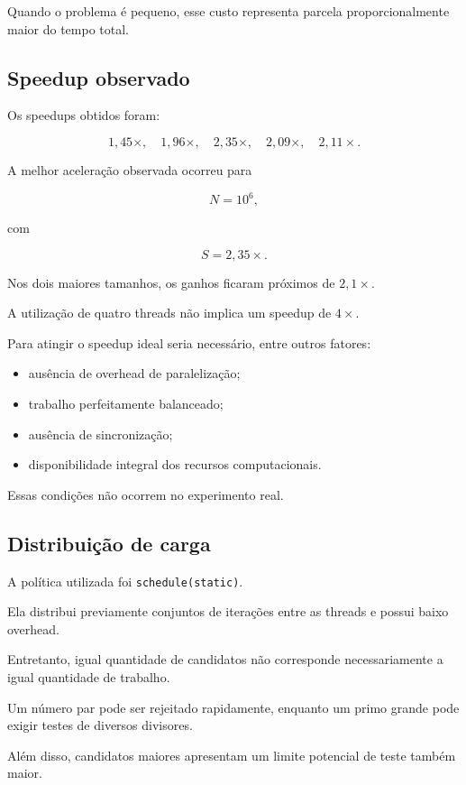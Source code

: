 Quando o problema é pequeno, esse custo representa parcela proporcionalmente
maior do tempo total.


\subsection{Speedup observado}

Os speedups obtidos foram:

\[
1,45\times,\quad
1,96\times,\quad
2,35\times,\quad
2,09\times,\quad
2,11\times.
\]

A melhor aceleração observada ocorreu para

\[
N=10^6,
\]

com

\[
S=2,35\times.
\]

Nos dois maiores tamanhos, os ganhos ficaram próximos de
\(2,1\times\).

A utilização de quatro threads não implica um speedup de \(4\times\).

Para atingir o speedup ideal seria necessário, entre outros fatores:

\begin{itemize}
    \item ausência de overhead de paralelização;
    \item trabalho perfeitamente balanceado;
    \item ausência de sincronização;
    \item disponibilidade integral dos recursos computacionais.
\end{itemize}

Essas condições não ocorrem no experimento real.


\subsection{Distribuição de carga}

A política utilizada foi \texttt{schedule(static)}.

Ela distribui previamente conjuntos de iterações entre as threads e possui
baixo overhead.

Entretanto, igual quantidade de candidatos não corresponde necessariamente
a igual quantidade de trabalho.

Um número par pode ser rejeitado rapidamente, enquanto um primo grande pode
exigir testes de diversos divisores.

Além disso, candidatos maiores apresentam um limite potencial de teste
também maior.


